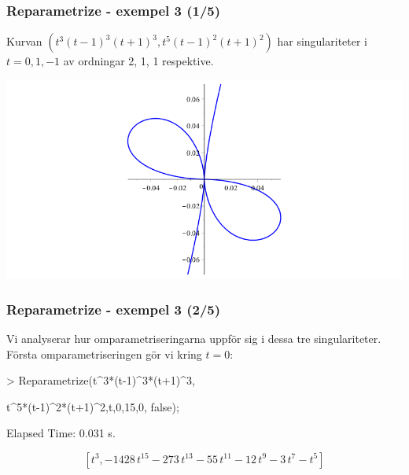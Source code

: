 \documentclass{beamer}
\begin{document}
\begin{frame}
	\frametitle{Reparametrize - exempel 3 (1/5)}
	
	\begin{example}
		Kurvan $\left(t^3(t - 1)^3(t + 1)^3,t^5(t - 1)^2(t + 1)^2\right)$ har singulariteter i $t = 0, 1, -1$ av ordningar 2, 1, 1 respektive.
  		
  		\begin{center}
  			\includegraphics[scale=0.35]{Export/kurvorplot2d3_0.png}
  		\end{center}
  	\end{example}
  \end{frame}
  
  \begin{frame}
  	\frametitle{Reparametrize - exempel 3 (2/5)}
  	
  	\begin{example}
		Vi analyserar hur omparametriseringarna uppför sig i dessa tre singulariteter. Första omparametriseringen gör vi kring $t=0$:

		\begin{semiverbatim}
			> Reparametrize(t\^{}3*(t-1)\^{}3*(t+1)\^{}3,

			\qquad t\^{}5*(t-1)\^{}2*(t+1)\^{}2,t,0,15,0, false);
			
			
			Elapsed Time: 0.031 s.
		\end{semiverbatim}
		
		\[\left[{t}^{3},-1428\,{t}^{15}-273\,{t}^{13}-55\,{t}^{11}-12\,{t}^{9}-3\,{t}^{7}-{t}^{5}\right]\]
	\end{example}
\end{frame}
\end{document}
